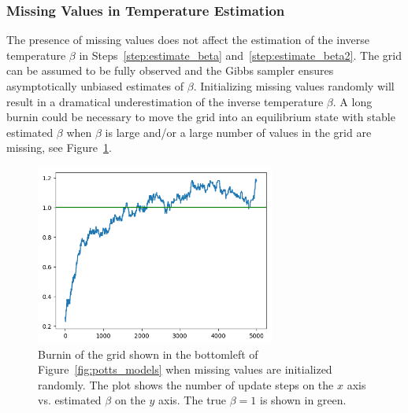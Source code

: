 \documentclass[12pt, twoside]{article}
\newcommand{\1}{\mathbb{1}}
\begin{document}
\subsubsection{Missing Values in Temperature  Estimation}\label{missing_values_temperature}
The presence of missing values does not affect the estimation of the inverse temperature $\beta$ in Steps~\ref{step:estimate_beta} and~\ref{step:estimate_beta2}. The grid can be assumed to be fully observed and the Gibbs sampler ensures asymptotically unbiased estimates of $\beta$.
Initializing missing values randomly will result in a dramatical underestimation of the inverse temperature $\beta$. 
A long burnin could be necessary to move the grid into an equilibrium state with stable estimated $\beta$ when $\beta$ is large and/or a large number of values in the grid are missing, see Figure~\ref{fig:beta_missing}.
%
\begin{figure}
	\centering
	\includegraphics[width=0.7\textwidth]{plots/beta_b1_it500_missing.png}
	\caption{Burnin of the grid shown in the bottomleft of Figure~\ref{fig:potts_models} when missing values are initialized randomly. The plot shows the number of update steps on the $x$ axis vs. estimated $\beta$ on the $y$ axis. The true $\beta = 1$ is shown in green.}
	\label{fig:beta_missing}
\end{figure}
%
\end{document}
